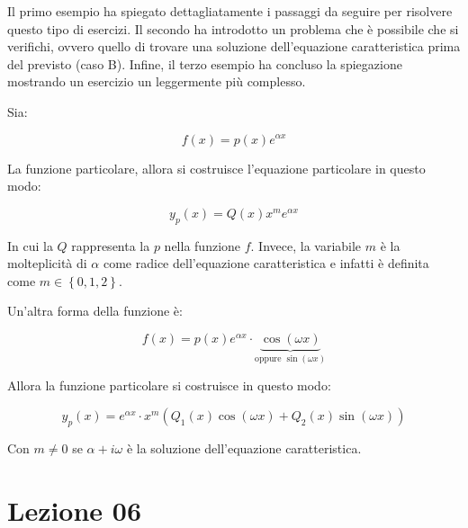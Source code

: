 \documentclass[a4paper]{article}
\begin{document}
	Il primo esempio ha spiegato dettagliatamente i passaggi da seguire per risolvere questo tipo di esercizi. Il secondo ha introdotto un problema che è possibile che si verifichi, ovvero quello di trovare una soluzione dell'equazione caratteristica prima del previsto (caso B). Infine, il terzo esempio ha concluso la spiegazione mostrando un esercizio un leggermente più complesso.\newline
	
	\noindent
	Sia:
	
	\begin{equation*}
		f\left(x\right) = p\left(x\right) e^{\alpha x}
	\end{equation*}
	
	\noindent
	La funzione particolare, allora si costruisce l'equazione particolare in questo modo:
	
	\begin{equation*}
		y_{p}\left(x\right) = Q\left(x\right) x^{m} e^{\alpha x}
	\end{equation*}

	\noindent
	In cui la $Q$ rappresenta la $p$ nella funzione $f$. Invece, la variabile $m$ è la molteplicità di $\alpha$ come radice dell'equazione caratteristica e infatti è definita come $m\in\left\{0,1,2\right\}$.\newline
	
	\noindent
	Un'altra forma della funzione è:
	
	\begin{equation*}
		f\left(x\right) = p\left(x\right) e^{\alpha x} \cdot \underbrace{\cos\left(\omega x\right)}_{\text{oppure } \sin\left(\omega x\right)}
	\end{equation*}
	
	\noindent
	Allora la funzione particolare si costruisce in questo modo:
	
	\begin{equation*}
		y_{p}\left(x\right) = e^{\alpha x} \cdot x^{m} \left(Q_{1}\left(x\right)\cos\left(\omega x\right) + Q_{2}\left(x\right)\sin\left(\omega x\right)\right)
	\end{equation*}

	\noindent
	Con $m \ne 0$ se $\alpha + i \omega$ è la soluzione dell'equazione caratteristica.
	
	\newpage
	
	\section{Lezione 06}
	
\end{document}
